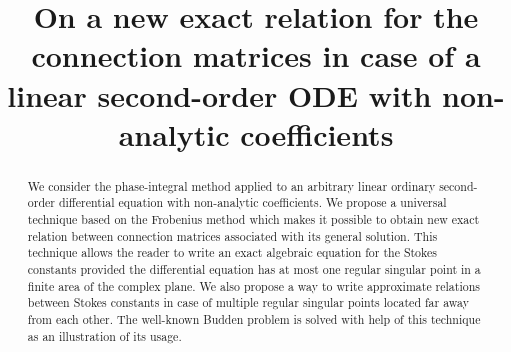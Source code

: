 \documentclass[asy]{iosart2x}
\begin{document}
\begin{frontmatter}

\title{On a new exact relation for the connection matrices in case of a linear second-order ODE with non-analytic coefficients}

\author{ }
\address{
,
Nizhny Novgorod 603950, }

\begin{abstract}
We consider the phase-integral method applied to an arbitrary linear ordinary second-order differential 
equation with non-analytic coefficients. We propose a universal technique based on the Frobenius method 
which makes it possible to obtain new exact relation between connection matrices associated with its general solution.
This technique allows the reader to write an exact algebraic equation for the Stokes constants provided 
the differential equation has at most one regular singular point in a finite area of the complex plane. 
We also propose a way to write approximate relations between Stokes constants in case of multiple regular 
singular points located far away from each other. The well-known Budden problem is solved with help of this 
technique as an illustration of its usage.
\end{abstract}


\begin{keyword}
\end{keyword}

\end{frontmatter}
\end{document}
